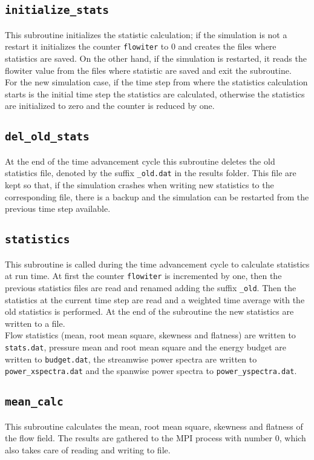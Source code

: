 \subsection{\texttt{initialize\_stats}}
This subroutine initializes the statistic calculation; if the simulation is not a restart it initializes the counter \texttt{flowiter} to 0 and creates the files where statistics are saved. On the other hand, if the simulation is restarted, it reads the flowiter value from the files where statistic are saved and exit the subroutine.\\
For the new simulation case, if the time step from where the statistics calculation starts is the initial time step the statistics are calculated, otherwise the statistics are initialized to zero and the counter is reduced by one.

\subsection{\texttt{del\_old\_stats}}
At the end of the time advancement cycle this subroutine deletes the old statistics file, denoted by the suffix \texttt{\_old.dat} in the results folder. This file are kept so that, if the simulation crashes when writing new statistics to the corresponding file, there is a backup and the simulation can be restarted from the previous time step available.

\subsection{\texttt{statistics}}
This subroutine is called during the time advancement cycle to calculate statistics at run time. At first the counter \texttt{flowiter} is incremented by one, then the previous statistics files are read and renamed adding the suffix \texttt{\_old}. Then the statistics at the current time step are read and a weighted time average with the old statistics is performed. At the end of the subroutine the new statistics are written to a file.\\
Flow statistics (mean, root mean square, skewness and flatness) are written to \texttt{stats.dat}, pressure mean and root mean square and the energy budget are written to \texttt{budget.dat}, the streamwise power spectra are written to \texttt{power\_xspectra.dat} and the spanwise power spectra to \texttt{power\_yspectra.dat}.

\subsection{\texttt{mean\_calc}}
This subroutine calculates the mean, root mean square, skewness and flatness of the flow field. The results are gathered to the MPI process with number 0, which also takes care of reading and writing to file.


